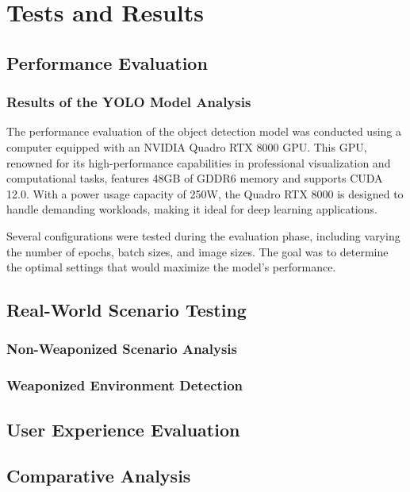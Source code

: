 \chapter{Tests and Results}
\label{chapter:tests}

\newenvironment{tests}
{\quote\itshape}
{\endquote}

\begin{tests}
\end{tests}

\section{Performance Evaluation}
\subsection{Results of the YOLO Model Analysis}
The performance evaluation of the object detection model was conducted using a computer equipped with an NVIDIA 
Quadro RTX 8000 GPU. This GPU, renowned for its high-performance capabilities in professional visualization and 
computational tasks, features 48GB of GDDR6 memory and supports CUDA 12.0. With a power usage capacity of 250W, 
the Quadro RTX 8000 is designed to handle demanding workloads, making it ideal for deep learning applications.

Several configurations were tested during the evaluation phase, including varying the number of epochs, batch sizes, 
and image sizes. The goal was to determine the optimal settings that would maximize the model's performance.


\section{Real-World Scenario Testing}
\subsection{Non-Weaponized Scenario Analysis}
\subsection{Weaponized Environment Detection}
\section{User Experience Evaluation}
\section{Comparative Analysis}